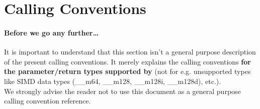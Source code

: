 %
%
%
%

\newpage

\section{Calling Conventions}

\paragraph{Before we go any further\ldots}

It is important to understand that this section isn't a general
purpose description of the present calling conventions.
It merely explains the calling conventions \textbf{for the parameter/return types
supported by \dc} (not for e.g. unsupported types like SIMD data types
(\_\_m64, \_\_m128, \_\_m128i, \_\_m128d), etc.).\\ We strongly advise the
reader not to use this document as a general purpose calling convention
reference.

\clearpage
\clearpage
\clearpage
\clearpage
\clearpage
\clearpage
\clearpage
\clearpage
\clearpage
\clearpage


